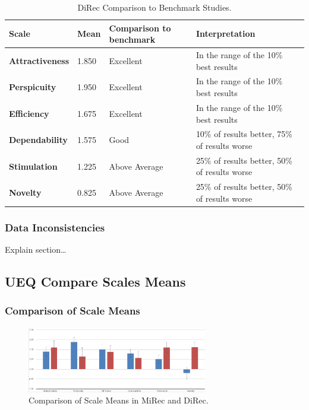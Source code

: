\begin{table}[t]
\centering
\begin{tabular}{|l|l|l|l|}
\hline
\textbf{Scale}          & \textbf{Mean} & \textbf{Comparison to benchmark} & \textbf{Interpretation}                       \\ \hline
\textbf{Attractiveness} & 1.850         & Excellent                         & In the range of the 10\% best results         \\ \hline
\textbf{Perspicuity}    & 1.950         & Excellent                         & In the range of the 10\% best results         \\ \hline
\textbf{Efficiency}     & 1.675         & Excellent                         & In the range of the 10\% best results         \\ \hline
\textbf{Dependability}  & 1.575         & Good                              & 10\% of results better, 75\% of results worse \\ \hline
\textbf{Stimulation}    & 1.225         & Above Average                     & 25\% of results better, 50\% of results worse \\ \hline
\textbf{Novelty}        & 0.825         & Above Average                     & 25\% of results better, 50\% of results worse \\ \hline
\end{tabular}
\caption{DiRec Comparison to Benchmark Studies.}
\label{table:table56}
\end{table}

\subsubsection{Data Inconsistencies}
Explain section\ldots

\subsection{UEQ Compare Scales Means}

\subsubsection{Comparison of Scale Means}

\begin{figure}[t]
\centering
\includegraphics[width=0.7\textwidth]{figures/compare}
\caption{Comparison of Scale Means in MiRec and DiRec.}
\label{fig:figure53}
\end{figure}

